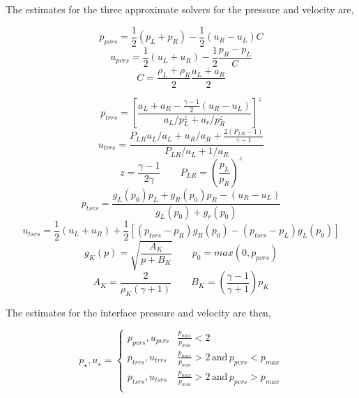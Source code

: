 \documentclass{article}
\begin{document}
The estimates for the three approximate solvers for the pressure and velocity are,

\begin{equation}
p_{pvrs} = \frac{1}{2} ( p_L + p_R) - \frac{1}{2} ( u_R - u_L) C
\end{equation}
\begin{equation}
u_{pvrs} = \frac{1}{2} (u_L + u_R) - \frac{1}{2} \frac{p_R - p_L}{C}
\end{equation}
\begin{equation}
C = \frac{\rho_L + \rho_R}{2} \frac{a_L + a_R}{2}
\end{equation}

\begin{equation}
p_{trrs} = \left[ \frac{a_L+a_R - \frac{\gamma -1}{2} ( u_R - u_L)}{a_L/p_L^z + a_r/p_R^z}\right]^z
\end{equation}
\begin{equation}
u_{trrs} = \frac{P_{LR} u_L/a_L + u_R/a_R + \frac{2(P_{LR}-1)}{\gamma -1}}{P_{LR}/a_L + 1/a_R}
\end{equation}
\begin{equation}
z = \frac{\gamma -1}{2 \gamma} \qquad P_{LR} = \left( \frac{p_L}{p_R} \right)^z
\end{equation}
\begin{equation}
p_{tsrs} = \frac{g_L(p_0) p_L + g_R(p_0) p_R - (u_R - u_L)}{g_L(p_0) + g_r(p_0)}
\end{equation}
\begin{equation}
u_{tsrs} = \frac{1}{2} (u_L + u_R) + \frac{1}{2}\left[ (p_{tsrs}-p_R) g_R(p_0) - (p_{tsrs} - p_L) g_L(p_0) \right]
\end{equation}
\begin{equation}
g_K (p) =\sqrt{\frac{A_K}{p + B_K}} \qquad p_0 = max(0,p_{pvrs})
\end{equation}
\begin{equation}
A_K =  \frac{2}{\rho_K ( \gamma + 1 ) } \qquad B_K = \left( \frac{\gamma -1}{\gamma + 1} \right) p_K
\end{equation}

The estimates for the interface pressure and velocity are then,

\begin{equation}
p_\star,u_\star = 
\begin{cases}
p_{pvrs},u_{pvrs} & \frac{p_{max}}{p_{min}} < 2 \\
p_{trrs}, u_{trrs} & \frac{p_{max}}{p_{min}} > 2 \, \text{and} \, p_{pvrs} < p_{max} \\ 
p_{tsrs}, u_{tsrs} & \frac{p_{max}}{p_{min}} > 2 \, \text{and} \, p_{pvrs} > p_{max} \\ 
\end{cases}
\end{equation}
\end{document}
